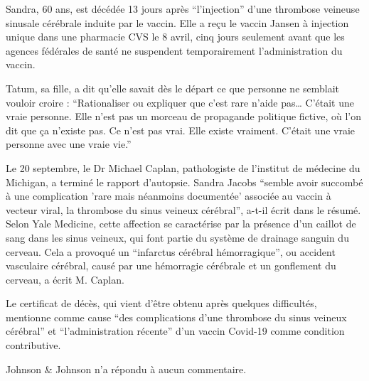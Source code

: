 Sandra, 60 ans, est décédée 13 jours après “l'injection” d'une thrombose
veineuse sinusale cérébrale induite par le vaccin. Elle a reçu le vaccin Jansen
à injection unique dans une pharmacie CVS le 8 avril, cinq jours seulement avant
que les agences fédérales de santé ne suspendent temporairement l'administration
du vaccin.

Tatum, sa fille, a dit qu'elle savait dès le départ ce que personne ne semblait
vouloir croire : “Rationaliser ou expliquer que c'est rare n'aide pas… C'était
une vraie personne. Elle n'est pas un morceau de propagande politique fictive,
où l'on dit que ça n'existe pas. Ce n'est pas vrai. Elle existe
vraiment. C'était une vraie personne avec une vraie vie.”

Le 20 septembre, le Dr Michael Caplan, pathologiste de l'institut de médecine du
Michigan, a terminé le rapport d'autopsie. Sandra Jacobs “semble avoir succombé
à une complication 'rare mais néanmoins documentée' associée au vaccin à vecteur
viral, la thrombose du sinus veineux cérébral”, a-t-il écrit dans le
résumé. Selon Yale Medicine, cette affection se caractérise par la présence d'un
caillot de sang dans les sinus veineux, qui font partie du système de drainage
sanguin du cerveau. Cela a provoqué un “infarctus cérébral hémorragique”, ou
accident vasculaire cérébral, causé par une hémorragie cérébrale et un
gonflement du cerveau, a écrit M. Caplan.

Le certificat de décès, qui vient d'être obtenu après quelques difficultés,
mentionne comme cause “des complications d'une thrombose du sinus veineux
cérébral” et “l'administration récente” d'un vaccin Covid-19 comme condition
contributive.

Johnson \& Johnson n'a répondu à aucun commentaire.


